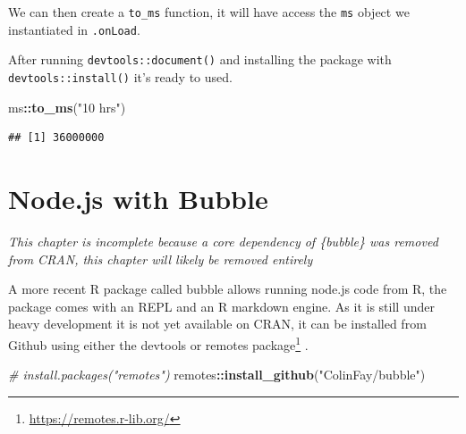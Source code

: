 \documentclass[
]{krantz}
\makeatletter
\newenvironment{Shaded}{\begin{snugshade}}{\end{snugshade}}
\newcommand{\CommentTok}[1]{\textcolor[rgb]{0.37,0.37,0.37}{\textit{#1}}}
\newcommand{\ControlFlowTok}[1]{\textcolor[rgb]{0.27,0.27,0.27}{\textbf{#1}}}
\newcommand{\KeywordTok}[1]{\textcolor[rgb]{0.27,0.27,0.27}{\textbf{#1}}}
\newcommand{\NormalTok}[1]{#1}
\newcommand{\OperatorTok}[1]{\textcolor[rgb]{0.43,0.43,0.43}{\textbf{#1}}}
\newcommand{\StringTok}[1]{\textcolor[rgb]{0.5,0.5,0.5}{#1}}
\renewcommand{\href}[2]{#2\footnote{\url{#1}}}
\newenvironment{kframe}{%
\medskip{}
\setlength{\fboxsep}{.8em}
 \def\at@end@of@kframe{}%
 \ifinner\ifhmode%
  \def\at@end@of@kframe{\end{minipage}}%
  \begin{minipage}{\columnwidth}%
 \fi\fi%
 \def\FrameCommand##1{\hskip\@totalleftmargin \hskip-\fboxsep
 \colorbox{shadecolor}{##1}\hskip-\fboxsep
     \hskip-\linewidth \hskip-\@totalleftmargin \hskip\columnwidth}%
 \MakeFramed {\advance\hsize-\width
   \@totalleftmargin\z@ \linewidth\hsize
   \@setminipage}}%
 {\par\unskip\endMakeFramed%
 \at@end@of@kframe}
\renewenvironment{Shaded}{\begin{kframe}}{\end{kframe}}
\makeatother
\begin{document}
We can then create a \texttt{to\_ms} function, it will have access the \texttt{ms} object we instantiated in \texttt{.onLoad}.

\begin{Shaded}
\end{Shaded}

After running \texttt{devtools::document()} and installing the package with \texttt{devtools::install()} it's ready to used.

\begin{Shaded}
\begin{Highlighting}[]
\NormalTok{ms}\OperatorTok{::}\KeywordTok{to\_ms}\NormalTok{(}\StringTok{"10 hrs"}\NormalTok{)}
\end{Highlighting}
\end{Shaded}

\begin{verbatim}
## [1] 36000000
\end{verbatim}

\hypertarget{node}{%
\chapter{Node.js with Bubble}\label{node}}

\emph{This chapter is incomplete because a core dependency of \{bubble\} was removed from CRAN, this chapter will likely be removed entirely}

A more recent R package called bubble allows running node.js code from R, the package comes with an REPL and an R markdown engine. As it is still under heavy development it is not yet available on CRAN, it can be installed from Github using either the devtools or \href{https://remotes.r-lib.org/}{remotes package} \citep{R-remotes}.

\begin{Shaded}
\begin{Highlighting}[]
\CommentTok{\# install.packages("remotes")}
\NormalTok{remotes}\OperatorTok{::}\KeywordTok{install\_github}\NormalTok{(}\StringTok{"ColinFay/bubble"}\NormalTok{)}
\end{Highlighting}
\end{Shaded}
\end{document}

